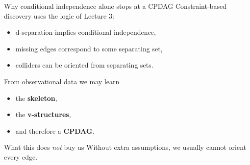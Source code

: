 \documentclass[dvipsnames,aspectratio=169,handout]{beamer}
\begin{document}
\begin{frame}{Why conditional independence alone stops at a CPDAG}
Constraint-based discovery uses the logic of Lecture 3:
\begin{itemize}
    \item d-separation implies conditional independence,
    \item missing edges correspond to some separating set,
    \item colliders can be oriented from separating sets.
\end{itemize}

\begin{block}{}
From observational data we may learn
\begin{itemize}
    \item the \textbf{skeleton},
    \item the \textbf{v-structures},
    \item and therefore a \textbf{CPDAG}.
\end{itemize}
\end{block}

\begin{alertblock}{What this does \emph{not} buy us}
Without extra assumptions, we usually cannot orient every edge.
\end{alertblock}
\end{frame}
\end{document}
